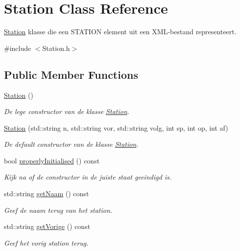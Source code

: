 \hypertarget{class_station}{}\section{Station Class Reference}
\label{class_station}


\hyperlink{class_station}{Station} klasse die een S\+T\+A\+T\+I\+ON element uit een X\+M\+L-\/bestand representeert.  




{\ttfamily \#include $<$Station.\+h$>$}

\subsection*{Public Member Functions}
\begin{DoxyCompactItemize}
\item 
\hyperlink{class_station_a73d335726aad1d844d81cda6d9fd74e6}{Station} ()
\begin{DoxyCompactList}\small\item\em De lege constructor van de klasse \hyperlink{class_station}{Station}. \end{DoxyCompactList}\item 
\hyperlink{class_station_a41fd39388109ad33ea86eb9831ab2f45}{Station} (std\+::string n, std\+::string vor, std\+::string volg, int sp, int op, int af)
\begin{DoxyCompactList}\small\item\em De default constructor van de klasse \hyperlink{class_station}{Station}. \end{DoxyCompactList}\item 
bool \hyperlink{class_station_a9ce626dd0599e3ea8107404a59c21e16}{properly\+Initialised} () const
\begin{DoxyCompactList}\small\item\em Kijk na of de constructor in de juiste staat geeindigd is. \end{DoxyCompactList}\item 
std\+::string \hyperlink{class_station_aea6c31c39a5e1eb4c30337e7ce489e69}{get\+Naam} () const
\begin{DoxyCompactList}\small\item\em Geef de naam terug van het station. \end{DoxyCompactList}\item 
std\+::string \hyperlink{class_station_a6776dd16c23da9f512d82883ea896fea}{get\+Vorige} () const
\begin{DoxyCompactList}\small\item\em Geef het vorig station terug. \end{DoxyCompactList}\item 

\end{DoxyCompactItemize}
